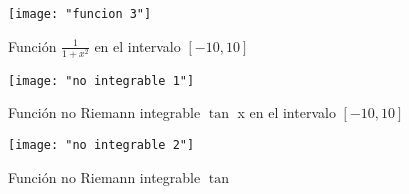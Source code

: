\documentclass[a4paper,12pt]{article}
\begin{document}
\begin{figure}
	\centering
	\caption{Función $ \frac{1}{1 + x^2} $ en el intervalo $ [-10,10] $}
	\texttt{[image: "funcion 3"]}
	\label{fig:funcion-3}
\end{figure}

\begin{figure}
	\centering
	\caption{Función no Riemann integrable $\tan$ x en el intervalo $ [-10,10] $}
	\label{fig:no-integrable-1}
	\texttt{[image: "no integrable 1"]}
\end{figure}

\begin{figure}
	\centering
	\caption{Función no Riemann integrable $\tan$}
	\label{fig:no-integrable-2}
	\texttt{[image: "no integrable 2"]}
\end{figure}




	
	
	
	
	

	
	
\end{document}
